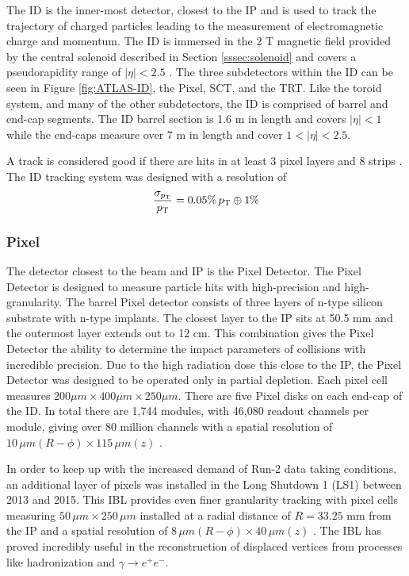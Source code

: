 		The \acrfull{ID} is the inner-most detector, closest to the \gls{IP} and is used to track the trajectory of charged particles leading to the measurement of electromagnetic charge and momentum. The \gls{ID} is immersed in the 2 T magnetic field provided by the central solenoid described in Section \ref{sssec:solenoid} and covers a pseudorapidity range of $|\eta|<2.5$ \cite{ATLAS-ID}. The three subdetectors within the \gls{ID} can be seen in Figure \ref{fig:ATLAS-ID}, the Pixel, \gls{SCT}, and the \gls{TRT}. Like the toroid system, and many of the other subdetectors, the \gls{ID} is comprised of barrel and end-cap segments. The \gls{ID} barrel section is 1.6 m in length and covers $|\eta|<1$ while the end-caps measure over 7 m in length and cover $1 < |\eta| < 2.5$. 

		A track is considered good if there are hits in at least 3 pixel layers and 8 strips \cite{tracking-2012}. The ID tracking system was designed with a resolution of 
		\begin{equation}\label{eqn:tracking-resolution}
		\frac{\sigma_{p_{\text{T}}}}{p_{\text{T}}} = 0.05 \% \, p_{\text{T}} \oplus 1\%
		\end{equation}
	
		\subsubsection{Pixel}\label{sssec:pixel}
			The detector closest to the beam and \gls{IP} is the Pixel Detector. The Pixel Detector is designed to measure particle hits with high-precision and high-granularity. The barrel Pixel detector consists of three layers of n-type silicon substrate with n-type implants. The closest layer to the \gls{IP} sits at 50.5 mm and the outermost layer extends out to 12 cm. This combination gives the Pixel Detector the ability to determine the impact parameters of collisions with incredible precision. Due to the high radiation dose this close to the \gls{IP}, the Pixel Detector was designed to be operated only in partial depletion. Each pixel cell measures $200 \mu m \times 400 \mu m \times 250 \mu m$. There are five Pixel disks on each end-cap of the \gls{ID}. In total there are 1,744 modules, with 46,080 readout channels per module, giving over 80 million channels with a spatial resolution of $10 \, \mu m (R-\phi) \times 115 \, \mu m (z)$ \cite{ATLAS-pixel}. 

			In order to keep up with the increased demand of Run-2 data taking conditions, an additional layer of pixels was installed in the Long Shutdown 1 (LS1) between 2013 and 2015. This \gls{IBL} provides even finer granularity tracking with pixel cells measuring $50 \, \mu m \times 250 \, \mu m$ installed at a radial distance of $R=33.25$ mm from the \gls{IP} and a spatial resolution of $8 \, \mu m (R-\phi) \times 40 \, \mu m (z)$ \cite{ATLAS-IBL}. The \gls{IBL} has proved incredibly useful in the reconstruction of displaced vertices from processes like \bjet hadronization and $\gamma \rightarrow e^+ e^-$.

